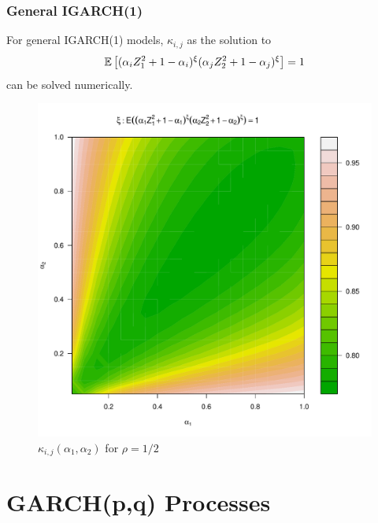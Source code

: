 \documentclass{beamer}
\begin{document}
\begin{frame}
  \frametitle{General IGARCH(1)}
  For general IGARCH(1) models, $\kappa_{i,j}$ as the solution to
  \begin{equation*}
    \mathbb{E} \left[
      (
      \alpha_i Z_1^2 + 1 - \alpha_i
      )^\xi
      (
      \alpha_j Z_2^2 + 1 - \alpha_j
      )^\xi\right] = 1
  \end{equation*}
  can be solved numerically.
  \begin{figure}[htb!]
    \centering
    \includegraphics[scale=0.3]{igarch_rho0dot5.pdf}
    \caption{$\kappa_{i,j}(\alpha_1, \alpha_2)$ for $\rho = 1/2$}
    \label{fig:xi_rho0.5}
  \end{figure}
\end{frame}

\section{GARCH(p,q) Processes}
\begin{equation*}
  
\end{equation*}


\end{document}
